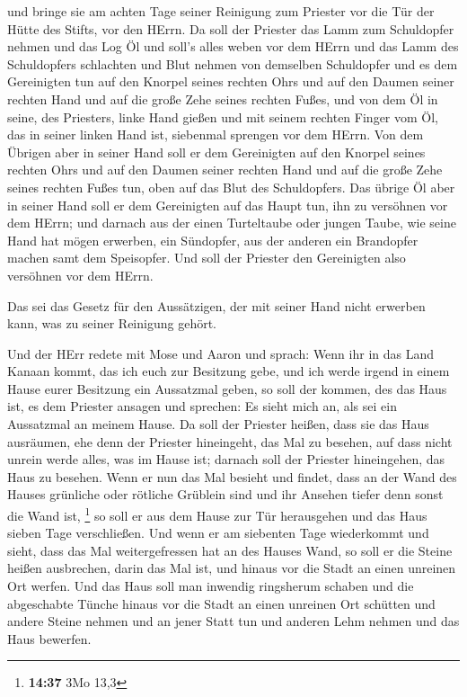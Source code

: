  und bringe sie am achten Tage seiner Reinigung zum
Priester vor die Tür der Hütte des Stifts, vor den HErrn. 
Da soll der Priester das Lamm zum Schuldopfer nehmen und das Log Öl und
soll's alles weben vor dem HErrn  und das Lamm des
Schuldopfers schlachten und Blut nehmen von demselben Schuldopfer und es
dem Gereinigten tun auf den Knorpel seines rechten Ohrs und auf den
Daumen seiner rechten Hand und auf die große Zehe seines rechten Fußes,
 und von dem Öl in seine, des Priesters, linke Hand gießen
 und mit seinem rechten Finger vom Öl, das in seiner linken
Hand ist, siebenmal sprengen vor dem HErrn.  Von dem
Übrigen aber in seiner Hand soll er dem Gereinigten auf den Knorpel
seines rechten Ohrs und auf den Daumen seiner rechten Hand und auf die
große Zehe seines rechten Fußes tun, oben auf das Blut des Schuldopfers.
 Das übrige Öl aber in seiner Hand soll er dem Gereinigten
auf das Haupt tun, ihn zu versöhnen vor dem HErrn;  und
darnach aus der einen Turteltaube oder jungen Taube, wie seine Hand hat
mögen erwerben,  ein Sündopfer, aus der anderen ein
Brandopfer machen samt dem Speisopfer. Und soll der Priester den
Gereinigten also versöhnen vor dem HErrn.

 Das sei das Gesetz für den Aussätzigen, der mit seiner
Hand nicht erwerben kann, was zu seiner Reinigung gehört.

 Und der HErr redete mit Mose und Aaron und sprach:
 Wenn ihr in das Land Kanaan kommt, das ich euch zur
Besitzung gebe, und ich werde irgend in einem Hause eurer Besitzung ein
Aussatzmal geben,  so soll der kommen, des das Haus ist, es
dem Priester ansagen und sprechen: Es sieht mich an, als sei ein
Aussatzmal an meinem Hause.  Da soll der Priester heißen,
dass sie das Haus ausräumen, ehe denn der Priester hineingeht, das Mal
zu besehen, auf dass nicht unrein werde alles, was im Hause ist; darnach
soll der Priester hineingehen, das Haus zu besehen.  Wenn
er nun das Mal besieht und findet, dass an der Wand des Hauses grünliche
oder rötliche Grüblein sind und ihr Ansehen tiefer denn sonst die Wand
ist, \footnote{\textbf{14:37} 3Mo 13,3}  so soll er aus dem
Hause zur Tür herausgehen und das Haus sieben Tage verschließen.
 Und wenn er am siebenten Tage wiederkommt und sieht, dass
das Mal weitergefressen hat an des Hauses Wand,  so soll er
die Steine heißen ausbrechen, darin das Mal ist, und hinaus vor die
Stadt an einen unreinen Ort werfen.  Und das Haus soll man
inwendig ringsherum schaben und die abgeschabte Tünche hinaus vor die
Stadt an einen unreinen Ort schütten  und andere Steine
nehmen und an jener Statt tun und anderen Lehm nehmen und das Haus
bewerfen.

